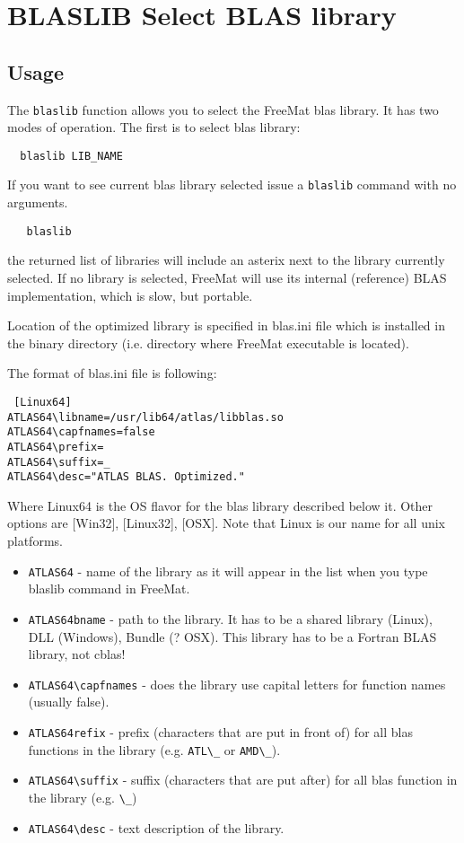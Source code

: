 \section{BLASLIB Select BLAS library}

\subsection{Usage}

The \verb|blaslib| function allows you to select the FreeMat blas library.
It has two modes of operation.  The first is to select blas library:
\begin{verbatim}
  blaslib LIB_NAME
\end{verbatim}
If you want to see current blas library selected
issue a \verb|blaslib| command with no arguments.
\begin{verbatim}
   blaslib
\end{verbatim}
the returned list of libraries will include an asterix next to the library
currently selected.  If no library is selected, FreeMat will use its internal (reference)
 BLAS implementation, which is slow, but portable.

Location of the optimized library is specified in blas.ini file which is
installed in the binary directory (i.e. directory where FreeMat
executable is located).

The format of blas.ini file is following:
\begin{verbatim}
 [Linux64]
ATLAS64\libname=/usr/lib64/atlas/libblas.so
ATLAS64\capfnames=false
ATLAS64\prefix=
ATLAS64\suffix=_
ATLAS64\desc="ATLAS BLAS. Optimized."
\end{verbatim}
Where Linux64 is the OS flavor for the blas library described below
it. Other options are [Win32], [Linux32], [OSX]. Note that Linux is our 
name for all unix platforms.
\begin{itemize}
\item  \verb|ATLAS64| - name of the library as it will appear in the list when you
type blaslib command in FreeMat.

\item  \verb|ATLAS64bname| - path to the library. It has to be a shared library
(Linux), DLL (Windows), Bundle (? OSX). This library has to be a Fortran
BLAS library, not cblas!

\item  \verb|ATLAS64\capfnames| - does the library use capital letters for function
names (usually false).

\item  \verb|ATLAS64refix| - prefix (characters that are put in front of) for all
blas functions in the library (e.g. \verb|ATL\_| or \verb|AMD\_|).

\item  \verb|ATLAS64\suffix| - suffix (characters that are put after) for all blas
function in the library (e.g. \verb|\_|)

\item  \verb|ATLAS64\desc| - text description of the library.

\end{itemize}

